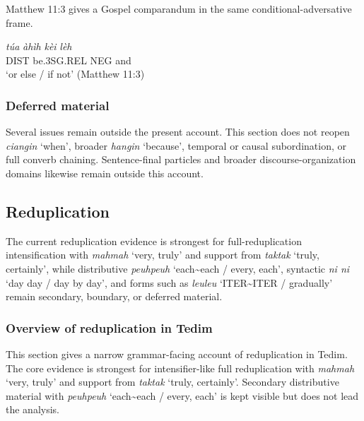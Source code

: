 \documentclass[
  11pt,
  a4paper,
]{article}
\newcommand{\tdim}[1]{\textit{#1}}
\newcommand{\tdimword}[1]{\textit{#1}}
\renewcommand{\textsc}[1]{{\footnotesize\MakeUppercase{#1}}}
\newcommand{\glossquote}[1]{`#1'}
\begin{document}
Matthew 11:3 gives a Gospel comparandum in the same
conditional-adversative frame.

\begin{exe}
\ex \label{ex:coord-ahih-kei-leh-matt11-3}
\gll \tdimword{túa} \tdimword{àhìh} \tdimword{kèi} \tdimword{lèh} \\
     \textsc{dist} be.\textsc{3sg}.\textsc{rel} \textsc{neg} and \\
\glt \glossquote{or else / if not} (Matthew 11:3)
\end{exe}

\subsubsection{Deferred material}\label{deferred-material-13}

Several issues remain outside the present account. This section does not
reopen \tdim{ciangin} \glossquote{when}, broader \tdim{hangin}
\glossquote{because}, temporal or causal subordination, or full converb
chaining. Sentence-final particles and broader discourse-organization
domains likewise remain outside this account.

\subsection{Reduplication}\label{reduplication}

The current reduplication evidence is strongest for full-reduplication
intensification with \tdim{mahmah} \glossquote{very, truly} and support
from \tdim{taktak} \glossquote{truly, certainly}, while distributive
\tdim{peuhpeuh} \glossquote{each\textasciitilde{}each / every, each},
syntactic \tdim{ni ni} \glossquote{day day / day by day}, and forms such
as \tdim{leuleu} \glossquote{ITER\textasciitilde{}ITER / gradually}
remain secondary, boundary, or deferred material.

\subsubsection{Overview of reduplication in
Tedim}\label{overview-of-reduplication-in-tedim}

This section gives a narrow grammar-facing account of reduplication in
Tedim. The core evidence is strongest for intensifier-like full
reduplication with \tdim{mahmah} \glossquote{very, truly} and support
from \tdim{taktak} \glossquote{truly, certainly}. Secondary distributive
material with \tdim{peuhpeuh}
\glossquote{each\textasciitilde{}each / every, each} is kept visible but
does not lead the analysis.
\end{document}
